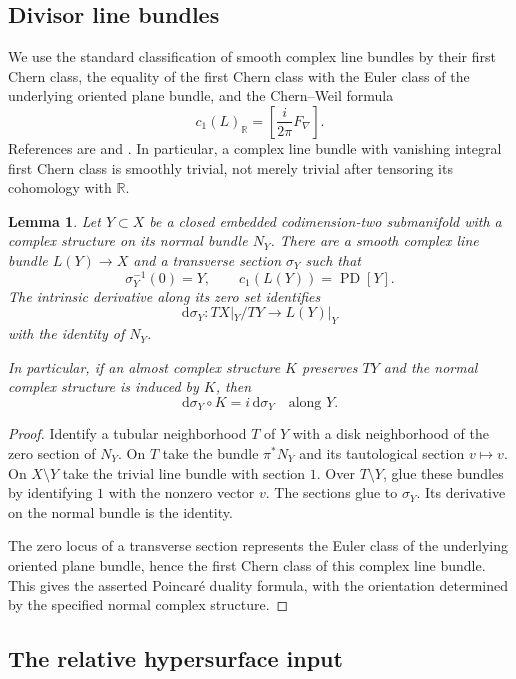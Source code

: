\documentclass[11pt]{article}
\newtheorem{lemma}[theorem]{Lemma}
\theoremstyle{definition}
\theoremstyle{remark}
\newcommand{\R}{\mathbb R}
\newcommand{\dd}{\mathrm d}
\newcommand{\PD}{\operatorname{PD}}
\begin{document}
\subsection{Divisor line bundles}

We use the standard classification of smooth complex line bundles by
their first Chern class, the equality of the first Chern class with
the Euler class of the underlying oriented plane bundle, and the
Chern--Weil formula
\[
c_1(L)_{\R}=\left[\frac{i}{2\pi}F_\nabla\right].
\]
References are \cite[Sections~9 and~14]{MS} and
\cite[Chapter~XII]{KN}.  In particular, a complex line bundle with
vanishing integral first Chern class is smoothly trivial, not merely
trivial after tensoring its cohomology with $\R$.

\begin{lemma}\label{lem:divisor-bundle}
Let $Y\subset X$ be a closed embedded codimension-two submanifold
with a complex structure on its normal bundle $N_Y$.  There are a
smooth complex line bundle $L(Y)\to X$ and a transverse section
$\sigma_Y$ such that
\[
\sigma_Y^{-1}(0)=Y,\qquad c_1(L(Y))=\PD[Y].
\]
The intrinsic derivative along its zero set identifies
\[
\dd\sigma_Y:TX|_Y/TY\longrightarrow L(Y)|_Y
\]
with the identity of $N_Y$.

In particular, if an almost complex structure $K$ preserves $TY$
and the normal complex structure is induced by $K$, then
\[
\dd\sigma_Y\circ K=i\,\dd\sigma_Y
\quad\text{along }Y.
\]
\end{lemma}

\begin{proof}
Identify a tubular neighborhood $T$ of $Y$ with a disk neighborhood
of the zero section of $N_Y$.  On $T$ take the bundle $\pi^*N_Y$
and its tautological section $v\mapsto v$.  On $X\setminus Y$
take the trivial line bundle with section $1$.  Over
$T\setminus Y$, glue these bundles by identifying $1$ with the
nonzero vector $v$.  The sections glue to $\sigma_Y$.
Its derivative on the normal bundle is the identity.

The zero locus of a transverse section represents the Euler class
of the underlying oriented plane bundle, hence the first Chern
class of this complex line bundle.  This gives the asserted
Poincar\'e duality formula, with the orientation determined by
the specified normal complex structure.
\end{proof}

\subsection{The relative hypersurface input}
\end{document}
